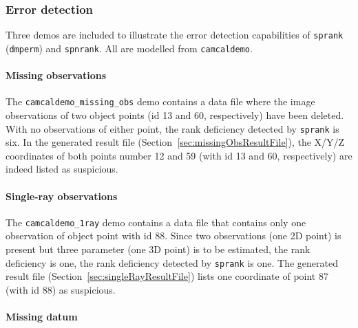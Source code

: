 \documentclass{article}
\begin{document}
\subsubsection{Error detection}
\label{sec:orgd452a54}

Three demos are included to illustrate the error detection
capabilities of \texttt{sprank} (\texttt{dmperm}) and
\texttt{spnrank}. All are modelled from \texttt{camcaldemo}.

\paragraph{Missing observations}
\label{sec:org9d3b212}

The \texttt{camcaldemo\_missing\_obs} demo contains a data file where the image
observations of two object points (id 13 and 60, respectively) have
been deleted. With no observations of either point, the rank
deficiency detected by \texttt{sprank} is six. In the generated result file
(Section~\ref{sec:missingObsResultFile}), the X/Y/Z coordinates
of both points number 12 and 59 (with id 13 and 60, respectively) are
indeed listed as suspicious.

\paragraph{Single-ray observations}
\label{sec:org46ccc6f}

The \texttt{camcaldemo\_1ray} demo contains a data file that contains
only one observation of object point with id 88. Since two
observations (one 2D point) is present but three parameter (one 3D
point) is to be estimated, the rank deficiency is one, the rank
deficiency detected by \texttt{sprank} is one. The generated result
file (Section~\ref{sec:singleRayResultFile}) lists one coordinate of
point 87 (with id 88) as suspicious.

\paragraph{Missing datum}
\label{sec:org3b01879}
\end{document}
